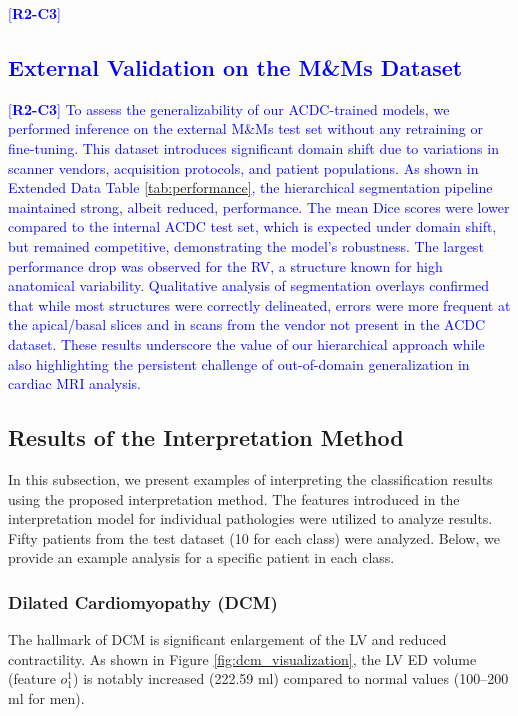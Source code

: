 \documentclass[fleqn,10pt]{wlscirep}
\newcommand{\revtag}[2]{[\textbf{R#1-C#2}]}
\newcommand{\Rtwo}[1]{\textcolor{blue}{#1}}
\begin{document}
\Rtwo{\revtag{2}{3}\subsection*{External Validation on the M\&Ms Dataset}}
\Rtwo{\revtag{2}{3} %
To assess the generalizability of our ACDC-trained models, we performed inference on the external M\&Ms test set without any retraining or fine-tuning. This dataset introduces significant domain shift due to variations in scanner vendors, acquisition protocols, and patient populations. As shown in Extended Data Table \ref{tab:performance}, the hierarchical segmentation pipeline maintained strong, albeit reduced, performance. The mean Dice scores were lower compared to the internal ACDC test set, which is expected under domain shift, but remained competitive, demonstrating the model's robustness. The largest performance drop was observed for the RV, a structure known for high anatomical variability. Qualitative analysis of segmentation overlays confirmed that while most structures were correctly delineated, errors were more frequent at the apical/basal slices and in scans from the vendor not present in the ACDC dataset. These results underscore the value of our hierarchical approach while also highlighting the persistent challenge of out-of-domain generalization in cardiac MRI analysis.
}

\subsection*{Results of the Interpretation Method}

In this subsection, we present examples of interpreting the classification results using the proposed interpretation method. The features introduced in the interpretation model for individual pathologies were utilized to analyze results. Fifty patients from the test dataset (10 for each class) were analyzed. Below, we provide an example analysis for a specific patient in each class.

\subsubsection*{Dilated Cardiomyopathy (DCM)}

The hallmark of DCM is significant enlargement of the LV and reduced contractility. As shown in Figure \ref{fig:dcm_visualization}, the LV ED volume (feature \(o_1^1\)) is notably increased (222.59 ml) compared to normal values (100–200 ml for men).
\end{document}
